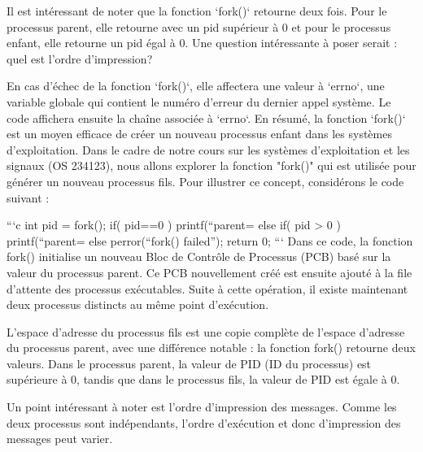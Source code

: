 \documentclass[12pt]{article}
\begin{document}
Il est intéressant de noter que la fonction `fork()` retourne deux fois. Pour le processus parent, elle retourne avec un pid supérieur à 0 et pour le processus enfant, elle retourne un pid égal à 0. Une question intéressante à poser serait : quel est l'ordre d'impression? 

En cas d'échec de la fonction `fork()`, elle affectera une valeur à `errno`, une variable globale qui contient le numéro d'erreur du dernier appel système. Le code affichera ensuite la chaîne associée à `errno`. En résumé, la fonction `fork()` est un moyen efficace de créer un nouveau processus enfant dans les systèmes d'exploitation.
Dans le cadre de notre cours sur les systèmes d'exploitation et les signaux (OS 234123), nous allons explorer la fonction "fork()" qui est utilisée pour générer un nouveau processus fils. Pour illustrer ce concept, considérons le code suivant : 

```c
int pid = fork(); 
if( pid==0 ) {
    printf(“parent=%
} 
else if( pid > 0 ) {
    printf(“parent=%
} 
else {
    perror(“fork() failed”); 
}
return 0; 
```
Dans ce code, la fonction fork() initialise un nouveau Bloc de Contrôle de Processus (PCB) basé sur la valeur du processus parent. Ce PCB nouvellement créé est ensuite ajouté à la file d'attente des processus exécutables. Suite à cette opération, il existe maintenant deux processus distincts au même point d'exécution. 

L'espace d'adresse du processus fils est une copie complète de l'espace d'adresse du processus parent, avec une différence notable : la fonction fork() retourne deux valeurs. Dans le processus parent, la valeur de PID (ID du processus) est supérieure à 0, tandis que dans le processus fils, la valeur de PID est égale à 0. 

Un point intéressant à noter est l'ordre d'impression des messages. Comme les deux processus sont indépendants, l'ordre d'exécution et donc d'impression des messages peut varier. 
\end{document}
